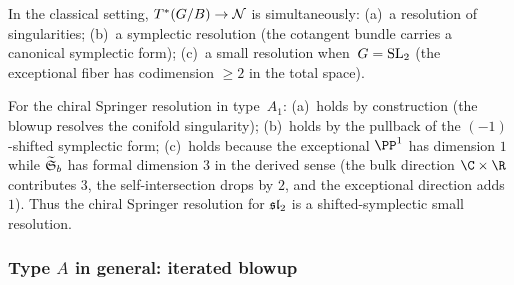 \begin{remark}
\label{rem:cotangent-comparison}
In the classical setting, $T^*(G/B) \to \mathcal{N}$ is simultaneously:
(a)~a resolution of singularities;
(b)~a symplectic resolution (the cotangent bundle carries a canonical
symplectic form);
(c)~a small resolution when~$G = \mathrm{SL}_2$ (the exceptional fiber has
codimension $\ge 2$ in the total space).

For the chiral Springer resolution in type~$A_1$:
(a)~holds by construction (the blowup resolves the conifold
singularity);
(b)~holds by the pullback of the $(-1)$-shifted symplectic form;
(c)~holds because the exceptional $\PP^1$ has dimension $1$ while
$\widetilde{\mathfrak{S}}_b$ has formal dimension $3$ in the derived
sense (the bulk direction $\C \times \R$ contributes $3$, the
self-intersection drops by $2$, and the exceptional direction adds $1$).
Thus the chiral Springer resolution for $\mathfrak{sl}_2$ is a
shifted-symplectic small resolution.
\end{remark}

\subsubsection{Type $A$ in general: iterated blowup}
\label{sssec:type-A-general}

